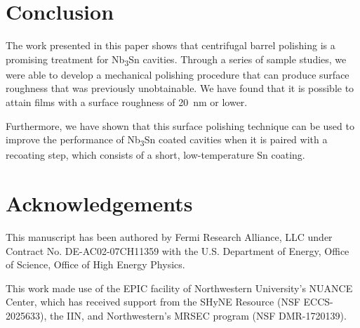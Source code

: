 \documentclass[reprint,amsmath,amssymb,aps]{revtex4-2}%
\begin{document}
%
\section{Conclusion}%
\label{sec:Conclusion}%
The work presented in this paper shows that centrifugal barrel polishing is a promising treatment for Nb\textsubscript{3}Sn cavities. Through a series of sample studies, we were able to develop a mechanical polishing procedure that can produce surface roughness that was previously unobtainable. We have found that it is possible to attain films with a surface roughness of 20~nm or lower. 

Furthermore, we have shown that this surface polishing technique can be used to improve the performance of Nb\textsubscript{3}Sn coated cavities when it is paired with a recoating step, which consists of a short, low-temperature Sn coating.

\section{Acknowledgements}
\label{sec:acknowledgements}
This manuscript has been authored by Fermi Research Alliance, LLC under Contract No. DE-AC02-07CH11359 with the U.S. Department of Energy, Office of Science, Office of High Energy Physics.

This work made use of the EPIC facility of Northwestern University’s NUANCE Center, which has received support from the SHyNE Resource (NSF ECCS-2025633), the IIN, and Northwestern's MRSEC program (NSF DMR-1720139).

%
%
\end{document}

